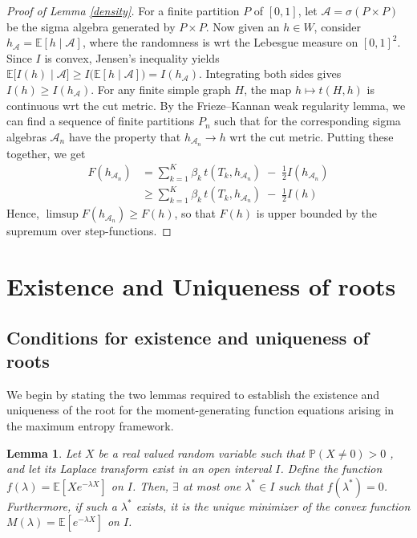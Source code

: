 \documentclass[12pt]{article}
\def\E{\mathbb{E}}
\numberwithin{equation}{section}
\newtheorem{lemma}{Lemma}[section]
\begin{document}
\begin{proof}[Proof of Lemma \ref{density}]
For a finite partition \(P\) of \([0,1]\), let \(\mathcal{A} = \sigma (P\times P)\) be the sigma algebra generated by \(P\times P\). Now given an \(h\in W\), consider \(h_{\mathcal{A}} = \mathbb{E}[h\mid\mathcal{A}]\), where the randomness is wrt the Lebesgue measure on \([0,1]^2\). Since $I$ is convex, Jensen's inequality yields
$\E\big[I(h)\mid\mathcal{A}\big]\ge I\big(\E[h\mid\mathcal{A}]\big)=I(h_{\mathcal{A}})$.
Integrating both sides gives $I(h)\ge I(h_{\mathcal{A}})$.
 For any finite simple graph \(H\), the map $h\mapsto t(H,h)$ is continuous wrt the cut metric.
By the Frieze--Kannan weak regularity lemma, we can find a sequence of finite partitions \(P_n\) such that for the corresponding sigma algebras \(\mathcal{A}_n\) have the property that \(h_{\mathcal{A}_n}\rightarrow h\) wrt the cut metric.
Putting these together, we get
\begin{align*} 
F(h_{\mathcal{A}_n}) &= \sum_{k=1}^K \beta_k\,t(T_k,h_{\mathcal{A}_n})\;-\;\frac{1}{2}I(h_{\mathcal{A}_n})\\
& \geq \sum_{k=1}^K \beta_k\,t(T_k,h_{\mathcal{A}_n})\;-\;\frac{1}{2}I(h)
\end{align*}
Hence, \(\limsup F(h_{\mathcal{A}_n}) \geq F(h)\), so that \(F(h)\) is upper bounded by the supremum over step-functions.
\end{proof}

\section{Existence and Uniqueness of roots \label{sec:root_unicity}}

\subsection{Conditions for existence and uniqueness of roots}

We begin by stating the two lemmas required to establish the existence and uniqueness of the root for the moment-generating function equations arising in the maximum entropy framework.

\begin{lemma}\label{uniqueness_1}
Let \(X\) be a real valued random variable such that \(\mathbb{P}(X\neq0)>0\) , and let its Laplace transform exist in an open interval \(I\). Define the function \(f(\lambda) = \mathbb{E}[Xe^{-\lambda X}]\) on \(I\). Then, \(\exists\) at most one \(\lambda^{*}\in I\) such that \(f(\lambda^{*})=0\). Furthermore, if such a \(\lambda^{*}\) exists, it is the unique minimizer of the convex function \(M(\lambda) = \mathbb{E}[e^{-\lambda X}]\) on \(I\).
\end{lemma}
\end{document}
